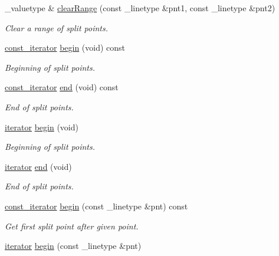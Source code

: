 \begin{DoxyCompactItemize}
\+\_\+valuetype \& \mbox{\hyperlink{classpartmap_a3b1d7eb7e874b0f11ea3a578de6d0263}{clear\+Range}} (const \+\_\+linetype \&pnt1, const \+\_\+linetype \&pnt2)
\begin{DoxyCompactList}\small\item\em Clear a range of split points. \end{DoxyCompactList}\item 
\mbox{\hyperlink{classpartmap_a01c7ea382b2a493dbd4a4431a2c39520}{const\+\_\+iterator}} \mbox{\hyperlink{classpartmap_a8c5b499b66156957ec95c209ad1440cc}{begin}} (void) const
\begin{DoxyCompactList}\small\item\em Beginning of split points. \end{DoxyCompactList}\item 
\mbox{\hyperlink{classpartmap_a01c7ea382b2a493dbd4a4431a2c39520}{const\+\_\+iterator}} \mbox{\hyperlink{classpartmap_a2bff6a7424e587f2e29ea8a7fcf81a43}{end}} (void) const
\begin{DoxyCompactList}\small\item\em End of split points. \end{DoxyCompactList}\item 
\mbox{\hyperlink{classpartmap_a795a7501233dbf866b98a51585552d06}{iterator}} \mbox{\hyperlink{classpartmap_a0df0de132681c65c1918d3e484c7679e}{begin}} (void)
\begin{DoxyCompactList}\small\item\em Beginning of split points. \end{DoxyCompactList}\item 
\mbox{\hyperlink{classpartmap_a795a7501233dbf866b98a51585552d06}{iterator}} \mbox{\hyperlink{classpartmap_a38026e8e8c8878781ac17d69124b0bd4}{end}} (void)
\begin{DoxyCompactList}\small\item\em End of split points. \end{DoxyCompactList}\item 
\mbox{\hyperlink{classpartmap_a01c7ea382b2a493dbd4a4431a2c39520}{const\+\_\+iterator}} \mbox{\hyperlink{classpartmap_a6dbc4a059f360ad84371d54e53afe5d7}{begin}} (const \+\_\+linetype \&pnt) const
\begin{DoxyCompactList}\small\item\em Get first split point after given point. \end{DoxyCompactList}\item 
\mbox{\hyperlink{classpartmap_a795a7501233dbf866b98a51585552d06}{iterator}} \mbox{\hyperlink{classpartmap_a5e11ec5430a4d4d8fab30dddf3b2ec4c}{begin}} (const \+\_\+linetype \&pnt)

\end{DoxyCompactItemize}
